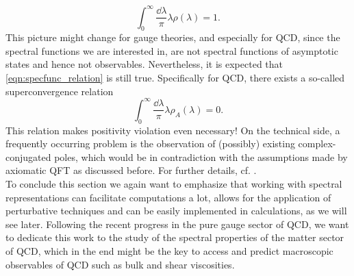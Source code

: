 \begin{equation}
	\int_0^{\infty}\frac{\dd\lambda}{\pi} \lambda\rho(\lambda) = 1.
\end{equation}
This picture might change for gauge theories, and especially for QCD, since the spectral functions we are interested in, are not spectral functions of asymptotic states and hence not observables. Nevertheless, it is expected that \eqref{eqn:specfunc_relation} is still true. Specifically for QCD, there exists a so-called superconvergence relation \,
\begin{equation}
	\int_0^{\infty}\frac{\dd\lambda}{\pi} \lambda\rho_A(\lambda) = 0.
\end{equation}
This relation makes positivity violation even necessary! On the technical side, a frequently occurring problem is the observation of (possibly) existing complex-conjugated poles, which would be in contradiction with the assumptions made by axiomatic QFT as discussed before.  For further details, cf. \cite{Lowdon2015}. \\
To conclude this section we again want to emphasize that working with spectral representations can facilitate computations a lot, allows for the application of perturbative techniques and can be easily implemented in calculations, as we will see later. Following the recent progress in the pure gauge sector of QCD, we want to dedicate this work to the study of the spectral properties of the matter sector of QCD, which in the end might be the key to access and predict macroscopic observables of QCD such as bulk and shear viscosities.



